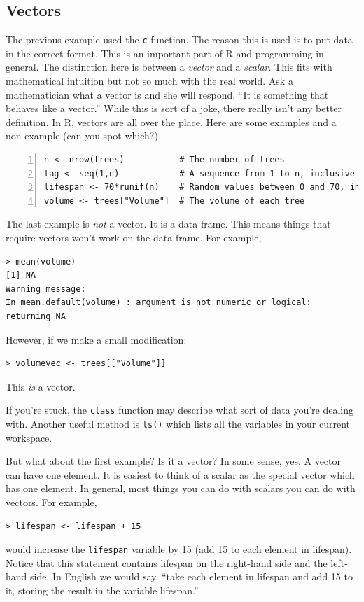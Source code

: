 \documentclass[12pt]{article}
\begin{document}
\subsection{Vectors}
The previous example used the \verb|c| function. The reason this is used is to put data in the correct format. This is an important part of R and programming in general. The distinction here is between a \emph{vector} and a \emph{scalar}. This fits with mathematical intuition but not so much with the real world. Ask a mathematician what a vector is and she will respond, ``It is something that behaves like a vector.'' While this is sort of a joke, there really isn't any better definition. In R, vectors are all over the place. Here are some examples and a non-example (can you spot which?)
\begin{Verbatim}[frame=single, fontsize=\small, numbers=left]
n <- nrow(trees)           # The number of trees
tag <- seq(1,n)            # A sequence from 1 to n, inclusive
lifespan <- 70*runif(n)    # Random values between 0 and 70, inclusive
volume <- trees["Volume"]  # The volume of each tree
\end{Verbatim}

The last example is \emph{not} a vector. It is a data frame. This means things that require vectors won't work on the data frame. For example,
\begin{Verbatim}[frame=single, fontsize=\small]
> mean(volume)
[1] NA
Warning message:
In mean.default(volume) : argument is not numeric or logical: returning NA
\end{Verbatim}
However, if we make a small modification:
\begin{verbatim}
> volumevec <- trees[["Volume"]]
\end{verbatim}
This \emph{is} a vector.

If you're stuck, the \verb|class| function may describe what sort of data you're dealing with. Another useful method is \verb|ls()| which lists all the variables in your current workspace.

But what about the first example? Is it a vector? In some sense, yes. A vector can have one element. It is easiest to think of a scalar as the special vector which has one element. In general, most things you can do with scalars you can do with vectors. For example,
\begin{verbatim}
> lifespan <- lifespan + 15
\end{verbatim}
would increase the \verb|lifespan| variable by 15 (add 15 to each element in lifespan). Notice that this statement contains lifespan on the right-hand side and the left-hand side. In English we would say, ``take each element in lifespan and add 15 to it, storing the result in the variable lifespan.''\
\end{document}
